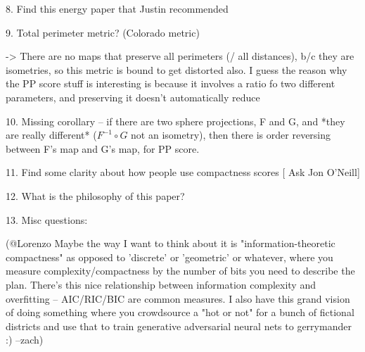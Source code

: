 8. Find this energy paper that Justin recommended

9. Total perimeter metric? (Colorado metric)

-> There are no maps that preserve all perimeters (/ all distances), b/c they are isometries, so this metric is bound to get distorted also. I guess the reason why the PP score stuff is interesting is because it involves a ratio fo two different parameters, and preserving it doesn't automatically reduce  

10. Missing corollary -- if there are two sphere projections, F and G, and *they are really different* ($F^{-1} \circ G$ not an isometry), then there is order reversing between F's map and G's map, for PP score.

11. Find some clarity about how people use compactness scores [ Ask Jon O'Neill]

12. What is the philosophy of this paper?

13. Misc questions:

(@Lorenzo Maybe the way I want to think about it is "information-theoretic compactness" as opposed to 'discrete' or 'geometric' or whatever, where you measure complexity/compactness by the number of bits you need to describe the plan. There's this nice relationship between information complexity and overfitting -- AIC/RIC/BIC are common measures. I also have this grand vision of doing something where you crowdsource a "hot or not" for a bunch of fictional districts and use that to train generative adversarial neural nets to gerrymander :) --zach)